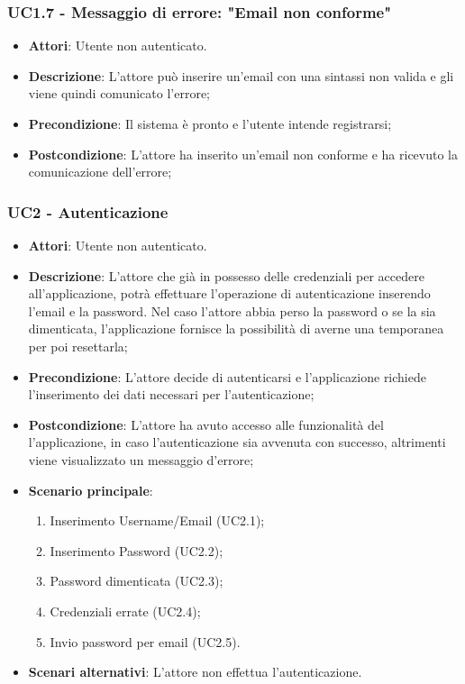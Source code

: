 \subsubsection{UC1.7 - Messaggio di errore: "Email non conforme"} 
\label{sssec:UC1.7} 
\begin{itemize} 
\item \textbf{Attori}: Utente non autenticato.
\item \textbf{Descrizione}: L'attore può inserire un'email con una sintassi non valida e gli viene quindi comunicato l'errore;
\item \textbf{Precondizione}: Il sistema è pronto e l'utente intende registrarsi;
\item \textbf{Postcondizione}: L'attore ha inserito un'email non conforme e ha ricevuto la comunicazione dell'errore;
\end{itemize} 
\subsubsection{UC2 - Autenticazione} 
\label{sssec:UC2} 
\begin{itemize} 
\item \textbf{Attori}: Utente non autenticato.
\item \textbf{Descrizione}: L'attore che già in possesso delle credenziali per accedere all'applicazione, potrà effettuare l'operazione di autenticazione inserendo l'email e la password. Nel caso l’attore abbia perso la password o se la sia dimenticata, l'applicazione fornisce la possibilità di averne una temporanea per poi resettarla;
\item \textbf{Precondizione}: L'attore decide di autenticarsi e l'applicazione richiede l'inserimento dei dati necessari per l'autenticazione;
\item \textbf{Postcondizione}: L'attore ha avuto accesso alle funzionalità del l'applicazione, in caso l'autenticazione sia avvenuta con successo, altrimenti viene visualizzato un messaggio d'errore;
\item \textbf{Scenario principale}: \begin{enumerate}\item Inserimento Username/Email (UC2.1);\item Inserimento Password (UC2.2);\item Password dimenticata (UC2.3);\item Credenziali errate (UC2.4);\item Invio password per email (UC2.5). 
 \end{enumerate}
\item \textbf{Scenari alternativi}: L’attore non effettua l’autenticazione.
\end{itemize} 
